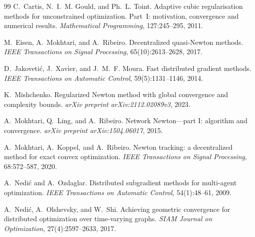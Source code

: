 \documentclass[11pt,a4paper]{article}
\begin{document}

\begin{thebibliography}{99}
	C.~Cartis, N.~I.~M. Gould, and Ph.~L. Toint.
	\newblock Adaptive cubic regularisation methods for unconstrained optimization. Part~I: motivation, convergence and numerical results.
	\newblock \emph{Mathematical Programming}, 127:245--295, 2011.
	
	M.~Eisen, A.~Mokhtari, and A.~Ribeiro.
	\newblock Decentralized quasi-{N}ewton methods.
	\newblock \emph{IEEE Transactions on Signal Processing}, 65(10):2613--2628, 2017.
	
	D.~Jakoveti{\'c}, J.~Xavier, and J.~M.~F. Moura.
	\newblock Fast distributed gradient methods.
	\newblock \emph{IEEE Transactions on Automatic Control}, 59(5):1131--1146, 2014.
	
	K.~Mishchenko.
	\newblock Regularized {N}ewton method with global convergence and complexity bounds.
	\newblock \emph{arXiv preprint arXiv:2112.02089v3}, 2023.
	
	A.~Mokhtari, Q.~Ling, and A.~Ribeiro.
	\newblock Network {N}ewton---part {I}: algorithm and convergence.
	\newblock \emph{arXiv preprint arXiv:1504.06017}, 2015.
	
	A.~Mokhtari, A.~Koppel, and A.~Ribeiro.
	\newblock Newton tracking: a decentralized method for exact convex optimization.
	\newblock \emph{IEEE Transactions on Signal Processing}, 68:572--587, 2020.
	
	A.~Nedi{\'c} and A.~Ozdaglar.
	\newblock Distributed subgradient methods for multi-agent optimization.
	\newblock \emph{IEEE Transactions on Automatic Control}, 54(1):48--61, 2009.
	
	A.~Nedi{\'c}, A.~Olshevsky, and W.~Shi.
	\newblock Achieving geometric convergence for distributed optimization over time-varying graphs.
	\newblock \emph{SIAM Journal on Optimization}, 27(4):2597--2633, 2017.
	

\end{thebibliography}
\end{document}
